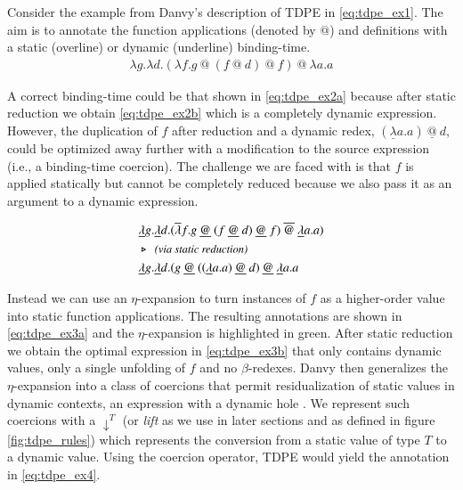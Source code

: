 \documentclass[a4paper,12pt,twoside,openright]{report}
\theoremstyle{definition}
\begin{document}
Consider the example from Danvy's description of TDPE \cite{danvy1999type} in \eqref{eq:tdpe_ex1}. The aim is to annotate the function applications (denoted by $@$) and definitions with a static (overline) or dynamic (underline) binding-time.
\begin{align}
    \lambda g.\lambda d.(\lambda f.g \:@ \: (f \: @ \: d)\: @ \:f) \: @ \: \lambda a.a \label{eq:tdpe_ex1}
\end{align}

A correct binding-time could be that shown in \eqref{eq:tdpe_ex2a} because after static reduction we obtain \eqref{eq:tdpe_ex2b} which is a completely dynamic expression. However, the duplication of $f$ after reduction and a dynamic redex, $(\underline{\lambda}a.a) \: \underline{@} \: d$, could be optimized away further with a modification to the source expression (i.e., a binding-time coercion). The challenge we are faced with is that $f$ is applied statically but cannot be completely reduced because we also pass it as an argument to a dynamic expression.
\begin{figure}[hbp!]
    \begin{align}
        & \underline{\lambda}g.\underline{\lambda} d.(\overline{\lambda} f.g \: \underline{@} \: (f \: \underline{@} \: d) \: \underline{@} \: f) \: \overline{@} \: \underline{\lambda} a.a) \label{eq:tdpe_ex2a} \\
        & \triangleright \:\: \emph{\small{\text{(via static reduction)}}} \nonumber \\
        & \underline{\lambda}g.\underline{\lambda} d.(g \: \underline{@} \: ((\underline{\lambda} a.a) \: \underline{@} \: d) \: \underline{@} \: \underline{\lambda} a.a \label{eq:tdpe_ex2b}
    \end{align}
\end{figure}

Instead we can use an $\eta$-expansion to turn instances of $f$ as a higher-order value into static function applications. The resulting annotations are shown in \eqref{eq:tdpe_ex3a} and the $\eta$-expansion is highlighted in green. After static reduction we obtain the optimal expression in \eqref{eq:tdpe_ex3b} that only contains dynamic values, only a single unfolding of $f$ and no $\beta$-redexes. Danvy then generalizes the $\eta$-expansion into a class of coercions that permit residualization of static values in dynamic contexts, an expression with a dynamic hole \cite{danvy1995essence}. We represent such coercions with a $\downarrow^T$ (or \textit{lift} as we use in later sections and as defined in figure \ref{fig:tdpe_rules}) which represents the conversion from a static value of type $T$ to a dynamic value. Using the coercion operator, TDPE would yield the annotation in \eqref{eq:tdpe_ex4}.
\end{document}
